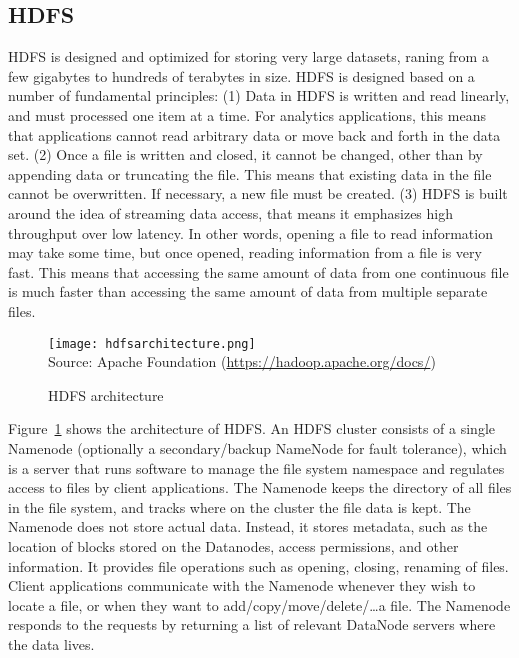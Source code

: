 \subsection{HDFS}

HDFS is designed and optimized for storing very large datasets, raning from a few gigabytes to hundreds of terabytes in size. HDFS is designed based on a number of fundamental principles: (1) Data in HDFS is written and read linearly, and must processed one item at a time. For analytics applications, this means that applications cannot read arbitrary data or move back and forth in the data set. (2) Once a file is written and closed, it cannot be changed, other than by appending data or truncating the file. This means that existing data in the file cannot be overwritten. If necessary, a new file must be created. (3) HDFS is built around the idea of streaming data access, that means it emphasizes high throughput over low latency. In other words, opening a file to read information may take some time, but once opened, reading information from a file is very fast. This means that accessing the same amount of data from one continuous file is much faster than accessing the same amount of data from multiple separate files.

\begin{figure}
\centering

\texttt{[image: hdfsarchitecture.png]} \\

\scriptsize Source: Apache Foundation (\url{https://hadoop.apache.org/docs/})
\caption{HDFS architecture}
\label{fig:hdfsarchitecture}
\end{figure}

Figure~\ref{fig:hdfsarchitecture} shows the architecture of HDFS. An HDFS cluster consists of a single Namenode (optionally a secondary/backup NameNode for fault tolerance), which is a server that runs software to manage the file system namespace and regulates access to files by client applications. The Namenode keeps the directory of all files in the file system, and tracks where on the cluster the file data is kept. The Namenode does not store actual data. Instead, it stores metadata, such as the location of blocks stored on the Datanodes, access permissions, and other information. It provides file operations such as opening, closing, renaming of files. Client applications communicate with the Namenode whenever they wish to locate a file, or when they want to add/copy/move/delete/\ldots a file. The Namenode responds to the requests by returning a list of relevant DataNode servers where the data lives.

